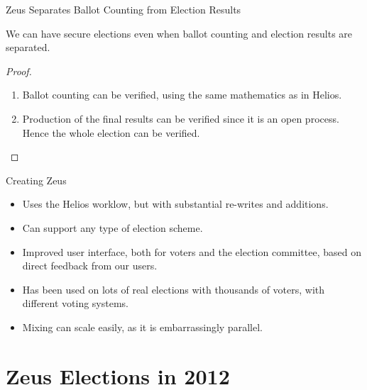 \documentclass[utf8]{beamer}
\begin{document}
\begin{frame}{Zeus Separates Ballot Counting from Election Results}
  
  \begin{theorem}
    We can have secure elections even when ballot counting and election
    results are separated.
  \end{theorem}

\begin{proof}
  \begin{enumerate}
  \item<1-> Ballot counting can be verified, using the same mathematics
    as in Helios.
  \item<2-> Production of the final results can be verified since it is
    an open process. Hence the whole election can be verified.\qedhere
  \end{enumerate}
\end{proof}

\end{frame}

\begin{frame}{Creating Zeus}

\begin{itemize}  
  \item Uses the Helios worklow, but with substantial re-writes and
    additions.
  \item Can support any type of election scheme.
  \item Improved user interface, both for voters and the election
    committee, based on direct feedback from our users.
  \item Has been used on lots of real elections with thousands of
    voters, with different voting systems.
  \item Mixing can scale easily, as it is embarrassingly parallel.
  \end{itemize}
  
\end{frame}

\section{Zeus Elections in 2012}
\end{document}
